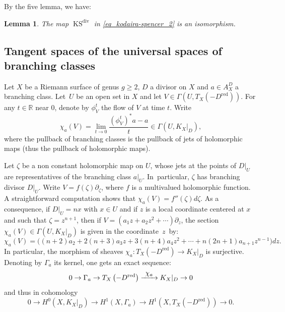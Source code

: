 \documentclass[10pt]{amsart}
\newcommand\To[1]{\mathchoice{\xrightarrow{\textstyle\kern4pt#1\kern3pt}}{\stackrel{#1}{\longrightarrow}}{}{}}
\newcommand{\red}{\mathrm{red}}
\DeclareMathOperator{\Div}{div}
\DeclareMathOperator{\KS}{KS}
\theoremstyle{definition}
\theoremstyle{plain}
\newtheorem{lemma}[definition]{Lemma}
\begin{document}
By the five lemma, we have:

\begin{lemma}\label{lemma_KS'_iso}
The map $\KS^{\Div}$ in \eqref{eq_kodaira-spencer_2} is an isomorphism.
\end{lemma}

\subsection{Tangent spaces of the universal spaces of branching classes}\label{subsection_tangent_spaces_univ_spaces_bc}

Let $X$ be a Riemann surface of genus $g \ge 2$, $D$ a divisor on $X$ and $a \in A_X^D$ a branching class.
Let~$U$ be an open set in $X$ and let $V \in\Gamma(U, T_X(-D^{\red}))$.
For any $t \in \mathbb R$ near $0$, denote by $\phi^t_V$ the flow of $V$ at time $t$.
Write\vspace*{-3pt}
\[
\chi_{a}(V) = \lim_{t \to 0} \frac{(\phi^t_V)^*a - a}t \in \Gamma(U, K_X|_D),
\]
where the pullback of branching classes is the pullback of jets of holomorphic maps (thus the pullback of holomorphic maps).

Let $\zeta$ be a non constant holomorphic map on $U$, whose jets at the points of $D|_U$ are representatives of the branching class $a|_U$. In~particular, $\zeta$ has branching divisor $D|_U$.
Write $V = f(\zeta)\partial_{\zeta}$, where $f$ is a multivalued holomorphic function.
A straightforward computation shows that $\chi_{a}(V) = f''(\zeta)d\zeta$.
As a consequence, if $D|_U = nx$ with $x \in U$ and if $z$ is a local coordinate centered at $x$ and such that $\zeta = z^{n+1}$, then if $V = (a_1z + a_2z^2 + \cdots)\partial_z$, the section $\chi_{a}(V) \in \Gamma(U, K_X|_D)$ is given in the coordinate~$z$~by:
\begin{equation}\label{eq_formule_derivee_classe}
\chi_{a}(V) = \bigl((n+2)a_2 + 2(n+3)a_3z + 3(n+4)a_4z^2 + \cdots + n(2n+1)a_{n+1}z^{n-1}\bigr)dz.
\end{equation}
In particular, the morphism of sheaves $\chi_{a}: T_X(-D^{\red}) \to K_X|_D$ is surjective.
Denoting by $\Gamma_{a}$ its kernel, one gets an exact sequence:
\begin{equation}\label{definition_gamma_alpha}
0 \to \Gamma_{a} \to T_X\left(-D^{\red}\right) \To{\chi_a} K_X|_D \to 0
\end{equation}
and thus in cohomology
\begin{equation}\label{eq_exact_cohom_classes}
0 \to H^0(X, K_X|_D) \to H^1(X, \Gamma_{a}) \to H^1\left(X, T_X\left(-D^{\red}\right)\right) \to 0.
\end{equation}
\end{document}
